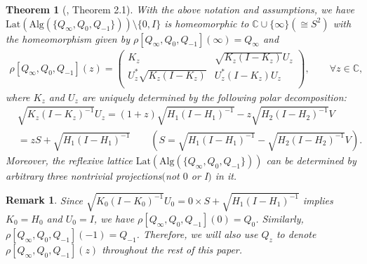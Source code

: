 \documentclass{amsart}
\newcommand{\Lat}{\mathrm{Lat}}
\newcommand{\Alg}{\mathrm{Alg}}
\newcommand{\C}{\mathbb C} %
\newtheorem{theorem}{Theorem}[section]
\newtheorem{remark}{Remark}[section]
\begin{document}
\begin{theorem}[\cite{Hou}, Theorem 2.1] \label{1thm1}
With the above notation and assumptions, we have $\Lat(\Alg(\{Q_{\infty}, Q_{0}, Q_{-1}\})) \setminus \{0, I\}$ is homeomorphic to $\C \cup \{\infty\} (\cong S^2)$ with
the homeomorphism given by $\rho[Q_{\infty}, Q_{0}, Q_{-1}](\infty) = Q_{\infty}$ and
\begin{align*}
\rho[Q_\infty, Q_0, Q_{-1}](z) = \left(
     \begin{array}{cc}
      K_{z} & \sqrt{K_{z}(I-K_{z})}U_{z} \\
      U_{z}^{*}\sqrt{K_{z}(I-K_{z})} & U_{z}^{*}(I-K_{z})U_{z} \\
  \end{array}
\right) , \qquad \forall z \in \C,
\end{align*}
where $K_z$ and $U_z$ are uniquely determined by the following polar decomposition:
\begin{equation}\label{eq1}
\begin{split}
&\sqrt{K_{z}(I-K_{z})^{-1}}U_{z} = (1+z)\sqrt{H_{1}(I-H_{1})^{-1}}-
                                   z\sqrt{H_{2}(I-H_{2})^{-1}}V \\
                                 &=zS + \sqrt{H_{1}(I-H_{1})^{-1}} \qquad (S = \sqrt{H_{1}(I-H_{1})^{-1}}- \sqrt{H_{2}(I-H_{2})^{-1}}V) .
\end{split}
\end{equation}
Moreover,  the reflexive lattice $\Lat(\Alg(\{Q_{\infty}, Q_{0}, Q_{-1}\}))$ can be determined by arbitrary three nontrivial projections$($not $0$ or I$)$ in it.
\end{theorem}

\begin{remark}\label{1re1}
Since $\sqrt{K_{0}(I-K_{0})^{-1}}U_{0} =
0\times S + \sqrt{H_{1}(I-H_{1})^{-1}}$ implies $K_{0} = H_{0}$ and $U_{0} = I$, 
we have $\rho[Q_{\infty}, Q_{0}, Q_{-1}](0) = Q_{0}$. Similarly, $\rho[Q_{\infty}, Q_{0}, Q_{-1}](-1) = Q_{-1}$. Therefore, we will also use $Q_{z}$ to denote $\rho[Q_{\infty}, Q_{0}, Q_{-1}](z)$ throughout the rest of this paper.
\end{remark}
\end{document}
